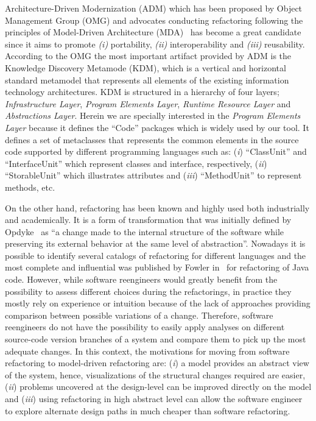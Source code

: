 Architecture-Driven Modernization (ADM) which has been proposed by Object Management Group (OMG) and advocates conducting refactoring following the principles of Model-Driven Architecture (MDA)~\cite{Kleppe:2003} has become a great candidate since it aims to promote \textit{(i)} portability, \textit{(ii)} interoperability and \textit{(iii)} reusability. According to the OMG the most important artifact provided by ADM is the Knowledge Discovery Metamode (KDM), which is a vertical and horizontal standard metamodel that represents all elements of the existing information  technology architectures. KDM is structured in a hierarchy of four layers; \textit{Infrastructure Layer}, \textit{Program Elements Layer}, \textit{ Runtime Resource Layer} and \textit{Abstractions Layer}. Herein we are specially interested in the \textit{Program Elements Layer} because it defines the ``Code'' packages which is widely used by our tool. It defines a set of metaclasses that represents the common elements in the source code supported by different programming languages such as: (\textit{i}) ``ClassUnit'' and ``InterfaceUnit'' which represent classes and interface, respectively, (\textit{ii}) ``StorableUnit'' which illustrates attributes and (\textit{iii}) ``MethodUnit'' to represent methods, etc.

On the other hand, refactoring has been known and highly used both industrially and academically. It is a form of transformation that was initially defined by Opdyke~\cite{Opdy92b} as ``a change made to the internal structure of the software while preserving its external behavior at the same level of abstraction''. Nowadays it is possible to identify several catalogs of refactoring for different languages and the most complete and influential was published by Fowler in~\cite{refactImpro} for refactoring of Java code. 
However, while software reengineers would greatly benefit from the possibility to assess different choices during the refactorings, in practice they mostly rely on experience or intuition because of the lack of approaches providing comparison between possible variations of a change. 
Therefore, software reengineers do not have the possibility to easily apply analyses on different source-code version branches of a system and compare them to pick up the most adequate changes. In this context, the motivations for moving from software refactoring  to model-driven refactoring are: 
(\textit{i}) a model provides an abstract view of the system, hence, visualizations of the structural changes required are easier, 
(\textit{ii}) problems uncovered at the design-level can be improved directly on the model and 
(\textit{iii}) using refactoring in high abstract level can allow the software engineer to explore alternate design paths in much cheaper than software refactoring.

